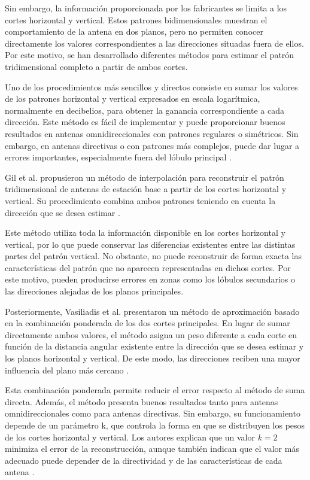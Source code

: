 Sin embargo, la información proporcionada por los fabricantes se limita a los cortes horizontal y vertical. Estos patrones bidimensionales muestran el comportamiento de la antena en dos planos, pero no permiten conocer directamente los valores correspondientes a las direcciones situadas fuera de ellos. Por este motivo, se han desarrollado diferentes métodos para estimar el patrón tridimensional completo a partir de ambos cortes.

Uno de los procedimientos más sencillos y directos consiste en sumar los valores de los patrones horizontal y vertical expresados en escala logarítmica, normalmente en decibelios, para obtener la ganancia correspondiente a cada dirección. Este método es fácil de implementar y puede proporcionar buenos resultados en antenas omnidireccionales con patrones regulares o simétricos. Sin embargo, en antenas directivas o con patrones más complejos, puede dar lugar a errores importantes, especialmente fuera del lóbulo principal \cite{7268850}.

Gil et al. propusieron un método de interpolación para reconstruir el patrón tridimensional de antenas de estación base a partir de los cortes horizontal y vertical. Su procedimiento combina ambos patrones teniendo en cuenta la dirección que se desea estimar \cite{gil2001}.

Este método utiliza toda la información disponible en los cortes horizontal y vertical, por lo que puede conservar las diferencias existentes entre las distintas partes del patrón vertical. No obstante, no puede reconstruir de forma exacta las características del patrón que no aparecen representadas en dichos cortes. Por este motivo, pueden producirse errores en zonas como los lóbulos secundarios o las direcciones alejadas de los planos principales.

Posteriormente, Vasiliadis et al. presentaron un método de aproximación basado en la combinación ponderada de los dos cortes principales. En lugar de sumar directamente ambos valores, el método asigna un peso diferente a cada corte en función de la distancia angular existente entre la dirección que se desea estimar y los planos horizontal y vertical. De este modo, las direcciones reciben una mayor influencia del plano más cercano \cite{vasiliadis2005}.

Esta combinación ponderada permite reducir el error respecto al método de suma directa. Además, el método presenta buenos resultados tanto para antenas omnidireccionales como para antenas directivas. Sin embargo, su funcionamiento depende de un parámetro k, que controla la forma en que se distribuyen los pesos de los cortes horizontal y vertical. Los autores explican que un valor $k = 2$ minimiza el error de la reconstrucción, aunque también indican que el valor más adecuado puede depender de la directividad y de las características de cada antena \cite{vasiliadis2005}.

